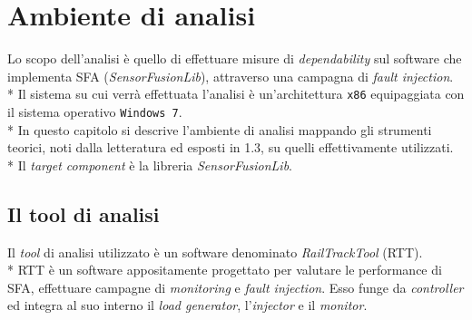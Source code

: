 \chapter{Ambiente di analisi}
Lo scopo dell'analisi \`e quello di effettuare misure di \emph{dependability} sul software che implementa SFA (\emph{SensorFusionLib}), attraverso una campagna di \emph{fault injection}.\\*
Il sistema su cui verr\`a effettuata l'analisi \`e un'architettura \texttt{x86} equipaggiata con il sistema operativo \texttt{Windows 7}.\\*
In questo capitolo si descrive l'ambiente di analisi mappando gli strumenti teorici, noti dalla letteratura ed esposti in 1.3, su quelli effettivamente utilizzati.\\*
Il \emph{target component} \`e la libreria \emph{SensorFusionLib}.
\section{Il tool di analisi}
Il \emph{tool} di analisi utilizzato \`e un software denominato \emph{RailTrackTool} (RTT).\\*
RTT \`e un software appositamente progettato per valutare le performance di SFA, effettuare campagne di \emph{monitoring} e \emph{fault injection}. Esso funge da \emph{controller} ed integra al suo interno il \emph{load generator}, l'\emph{injector} e il \emph{monitor}.
